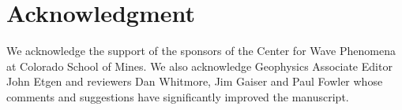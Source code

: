 \section{Acknowledgment}
We acknowledge the support of the sponsors of the Center for Wave
Phenomena at Colorado School of Mines. We also acknowledge Geophysics
Associate Editor John Etgen and reviewers Dan Whitmore, Jim Gaiser and
Paul Fowler whose comments and suggestions have significantly improved
the manuscript.
